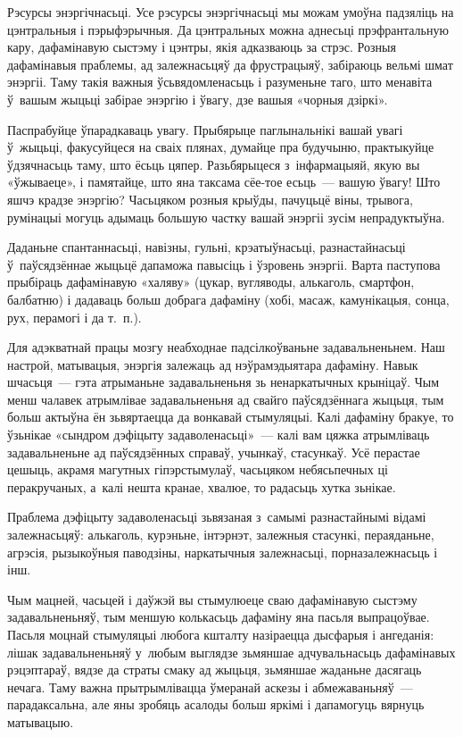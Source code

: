 Рэсурсы энэргічнасьці. Усе рэсурсы энэргічнасьці мы можам умоўна падзяліць на цэнтральныя і пэрыфэрычныя. Да цэнтральных можна аднесьці прэфрантальную кару, дафамінавую сыстэму і цэнтры, якія адказваюць за стрэс. Розныя дафамінавыя праблемы, ад залежнасьцяў да фрустрацыяў, забіраюць вельмі шмат энэргіі. Таму такія важныя ўсьвядомленасьць і разуменьне таго, што менавіта ў~вашым жыцьці забірае энэргію і ўвагу, дзе вашыя «чорныя дзіркі».

Паспрабуйце ўпарадкаваць увагу. Прыбярыце паглынальнікі вашай увагі ў~жыцьці, факусуйцеся на сваіх плянах, думайце пра будучыню, практыкуйце ўдзячнасьць таму, што ёсьць цяпер. Разьбярыцеся з~інфармацыяй, якую вы «ўжываеце», і памятайце, што яна таксама сёе-тое есьць~--- вашую ўвагу! Што яшчэ крадзе энэргію? Часьцяком розныя крыўды, пачуцьцё віны, трывога, румінацыі могуць адымаць большую частку вашай энэргіі зусім непрадуктыўна.

Даданьне спантаннасьці, навізны, гульні, крэатыўнасьці, разнастайнасьці ў~паўсядзённае жыцьцё дапаможа павысіць і ўзровень энэргіі. Варта паступова прыбіраць дафамінавую «халяву» (цукар, вугляводы, алькаголь, смартфон, балбатню) і дадаваць больш добрага дафаміну (хобі, масаж, камунікацыя, сонца, рух, перамогі і да т.~п.).

Для адэкватнай працы мозгу неабходнае падсілкоўваньне задавальненьнем. Наш настрой, матывацыя, энэргія залежаць ад нэўрамэдыятара дафаміну. Навык шчасьця~--- гэта атрыманьне задавальненьня зь ненаркатычных крыніцаў. Чым менш чалавек атрымлівае задавальненьня ад свайго паўсядзённага жыцьця, тым больш актыўна ён зьвяртаецца да вонкавай стымуляцыі. Калі дафаміну бракуе, то ўзьнікае «сындром дэфіцыту задаволенасьці»~--- калі вам цяжка атрымліваць задавальненьне ад паўсядзённых справаў, учынкаў, стасункаў. Усё перастае цешыць, акрамя магутных гіпэрстымулаў, часьцяком небясьпечных ці перакручаных, а~калі нешта кранае, хвалюе, то радасьць хутка зьнікае.

Праблема дэфіцыту задаволенасьці зьвязаная з~самымі разнастайнымі відамі залежнасьцяў: алькаголь, курэньне, інтэрнэт, залежныя стасункі, пераяданьне, агрэсія, рызыкоўныя паводзіны, наркатычныя залежнасьці, порназалежнасьць і інш.

Чым мацней, часьцей і даўжэй вы стымулюеце сваю дафамінавую сыстэму задавальненьняў, тым меншую колькасьць дафаміну яна пасьля выпрацоўвае. Пасьля моцнай стымуляцыі любога кшталту назіраецца дысфарыя і ангеданія: лішак задавальненьняў у~любым выглядзе зьмяншае адчувальнасьць дафамінавых рэцэптараў, вядзе да страты смаку ад жыцьця, зьмяншае жаданьне дасягаць нечага. Таму важна прытрымлівацца ўмеранай аскезы і абмежаваньняў~--- парадаксальна, але яны зробяць асалоды больш яркімі і дапамогуць вярнуць матывацыю.

